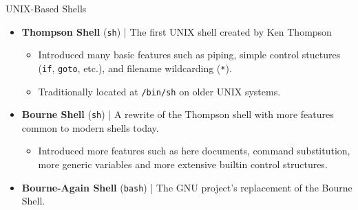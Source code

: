 \documentclass[11pt]{beamer}
\begin{document}
\begin{frame}{UNIX-Based Shells}
	\begin{itemize}
		\item \textbf{Thompson Shell} (\texttt{sh}) | The first UNIX shell created by Ken Thompson
		\begin{itemize}
			\item Introduced many basic features such as piping, simple control stuctures (\texttt{if}, \texttt{goto}, etc.), and filename wildcarding (\texttt{*}).
			\item Traditionally located at \texttt{/bin/sh} on older UNIX systems.
		\end{itemize}
		\item \textbf{Bourne Shell} (\texttt{sh}) | A rewrite of the Thompson shell with more features common to modern shells today.
		\begin{itemize}
			\item Introduced more features such as here documents, command substitution, more generic variables and more extensive builtin control structures.
		\end{itemize}
		\color{blue} \item \textbf{Bourne-Again Shell} (\texttt{bash}) | The GNU project's replacement of the Bourne Shell.
	\end{itemize}
\end{frame}
\end{document}
